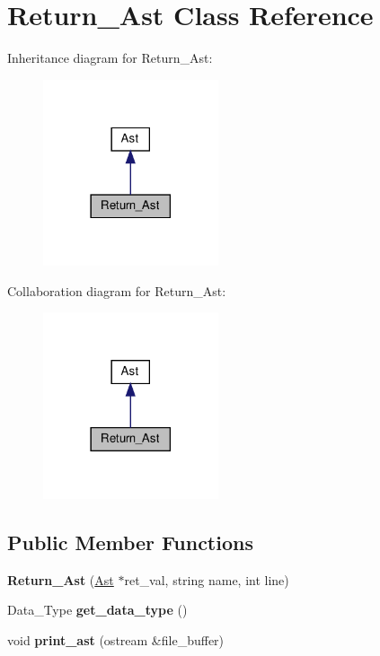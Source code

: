 \hypertarget{classReturn__Ast}{}\section{Return\+\_\+\+Ast Class Reference}
\label{classReturn__Ast}


Inheritance diagram for Return\+\_\+\+Ast\+:
\nopagebreak
\begin{figure}[H]
\begin{center}
\leavevmode
\includegraphics[width=146pt]{classReturn__Ast__inherit__graph}
\end{center}
\end{figure}


Collaboration diagram for Return\+\_\+\+Ast\+:
\nopagebreak
\begin{figure}[H]
\begin{center}
\leavevmode
\includegraphics[width=146pt]{classReturn__Ast__coll__graph}
\end{center}
\end{figure}
\subsection*{Public Member Functions}
\begin{DoxyCompactItemize}
\item 
\mbox{\label{classReturn__Ast_ab02aa131280d8314f894b7d87d443e64}} 
{\bfseries Return\+\_\+\+Ast} (\hyperlink{classAst}{Ast} $\ast$ret\+\_\+val, string name, int line)
\item 
\mbox{\label{classReturn__Ast_a26280c96f04206a8690637e35438cf50}} 
Data\+\_\+\+Type {\bfseries get\+\_\+data\+\_\+type} ()
\item 
\mbox{\label{classReturn__Ast_a7861d8777e5ec2d29236fa0402f90a46}} 
void {\bfseries print\+\_\+ast} (ostream \&file\+\_\+buffer)
\end{DoxyCompactItemize}
